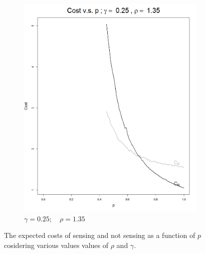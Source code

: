 \documentclass[11pt]{article}
\numberwithin{equation}{section}
\begin{document}
\begin{figure}[h!]
\begin{subfigure}[b]{0.49\textwidth}
	\includegraphics[width=\textwidth]{cost_vs_p_025_135}
		\caption{$\gamma=0.25;\quad\rho=1.35$}
		\label{cost_vs_p_025_135}
	\end{subfigure}
	\caption{The expected costs of sensing and not sensing as a function of $p$ cosidering various values values of $\rho$ and $\gamma$.}\label{CostVsP}
\end{figure}

\newpage
%
%
%
%
%
%
%
\end{document}
